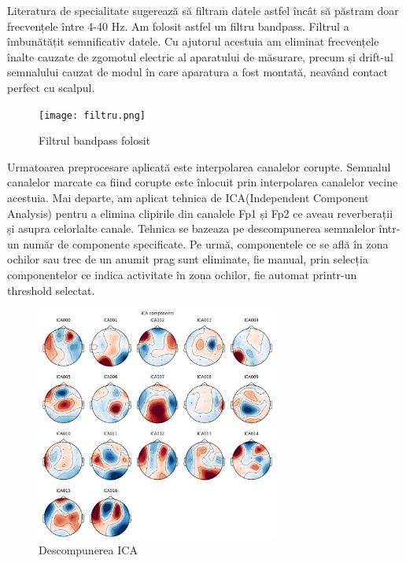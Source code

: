 Literatura de specialitate sugerează să filtram datele astfel încât să păstram doar frecvențele între 4-40 Hz. Am folosit astfel un filtru bandpass. Filtrul a îmbunătățit semnificativ datele. Cu ajutorul acestuia am eliminat frecvențele înalte cauzate de zgomotul electric al aparatului de măsurare, precum și drift-ul semnalului cauzat de modul în care aparatura a fost montată, neavând contact perfect cu scalpul.  %

\setlength{\abovecaptionskip}{0pt}
\setlength{\belowcaptionskip}{0pt}
\clearpage
\begin{figure}[h]
    \centering
    \texttt{[image: filtru.png]}
    \caption{Filtrul bandpass folosit}
    \label{fig:vizualizare_filtru}
\end{figure}

Urmatoarea preprocesare aplicată este interpolarea canalelor corupte. Semnalul canalelor marcate ca fiind corupte este înlocuit prin interpolarea canalelor vecine acestuia. Mai departe, am aplicat tehnica de ICA(Independent Component Analysis) pentru a elimina clipirile din canalele Fp1 și Fp2 ce aveau reverberații și asupra celorlalte canale. Tehnica se bazeaza pe descompunerea semnalelor într-un număr de componente specificate. Pe urmă, componentele ce se află în zona ochilor sau trec de un anumit prag sunt eliminate, fie manual, prin selecția componentelor ce indica activitate în zona ochilor, fie automat printr-un threshold selectat.

\vspace{1em}
\begin{figure}[h]
    \centering
    \includegraphics[width=8cm]{images/ica_components.png}
    \caption{Descompunerea ICA}
    \label{fig:vizualizare_filtru}
\end{figure}


